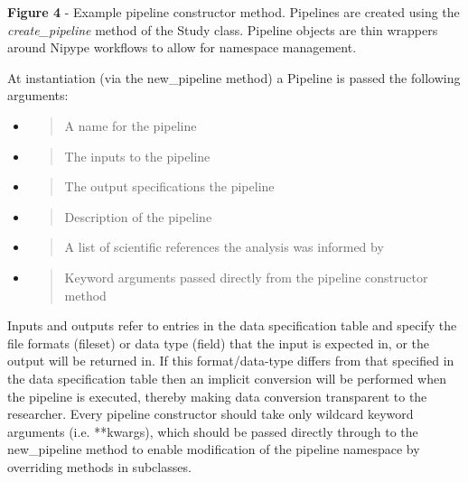
\textbf{Figure 4} - Example pipeline constructor method. Pipelines are
created using the \emph{create\_pipeline} method of the Study class.
Pipeline objects are thin wrappers around Nipype workflows to allow for
namespace management.

At instantiation (via the new\_pipeline method) a Pipeline is passed the
following arguments:

\begin{itemize}
\item
  \begin{quote}
  A name for the pipeline
  \end{quote}
\item
  \begin{quote}
  The inputs to the pipeline
  \end{quote}
\item
  \begin{quote}
  The output specifications the pipeline
  \end{quote}
\item
  \begin{quote}
  Description of the pipeline
  \end{quote}
\item
  \begin{quote}
  A list of scientific references the analysis was informed by
  \end{quote}
\item
  \begin{quote}
  Keyword arguments passed directly from the pipeline constructor method
  \end{quote}
\end{itemize}

Inputs and outputs refer to entries in the data specification table and
specify the file formats (fileset) or data type (field) that the input
is expected in, or the output will be returned in. If this
format/data-type differs from that specified in the data specification
table then an implicit conversion will be performed when the pipeline is
executed, thereby making data conversion transparent to the researcher.
Every pipeline constructor should take only wildcard keyword arguments
(i.e. **kwargs), which should be passed directly through to the
new\_pipeline method to enable modification of the pipeline namespace by
overriding methods in subclasses.

